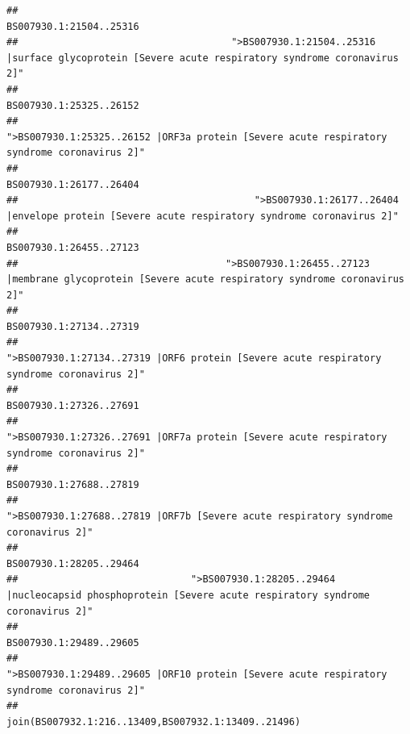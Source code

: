\documentclass[
]{article}
\begin{document}
\begin{verbatim}
##                                                                                                                BS007930.1:21504..25316 
##                                     ">BS007930.1:21504..25316 |surface glycoprotein [Severe acute respiratory syndrome coronavirus 2]" 
##                                                                                                                BS007930.1:25325..26152 
##                                            ">BS007930.1:25325..26152 |ORF3a protein [Severe acute respiratory syndrome coronavirus 2]" 
##                                                                                                                BS007930.1:26177..26404 
##                                         ">BS007930.1:26177..26404 |envelope protein [Severe acute respiratory syndrome coronavirus 2]" 
##                                                                                                                BS007930.1:26455..27123 
##                                    ">BS007930.1:26455..27123 |membrane glycoprotein [Severe acute respiratory syndrome coronavirus 2]" 
##                                                                                                                BS007930.1:27134..27319 
##                                             ">BS007930.1:27134..27319 |ORF6 protein [Severe acute respiratory syndrome coronavirus 2]" 
##                                                                                                                BS007930.1:27326..27691 
##                                            ">BS007930.1:27326..27691 |ORF7a protein [Severe acute respiratory syndrome coronavirus 2]" 
##                                                                                                                BS007930.1:27688..27819 
##                                                    ">BS007930.1:27688..27819 |ORF7b [Severe acute respiratory syndrome coronavirus 2]" 
##                                                                                                                BS007930.1:28205..29464 
##                              ">BS007930.1:28205..29464 |nucleocapsid phosphoprotein [Severe acute respiratory syndrome coronavirus 2]" 
##                                                                                                                BS007930.1:29489..29605 
##                                            ">BS007930.1:29489..29605 |ORF10 protein [Severe acute respiratory syndrome coronavirus 2]" 
##                                                                                    join(BS007932.1:216..13409,BS007932.1:13409..21496) 

\end{verbatim}
\end{document}

